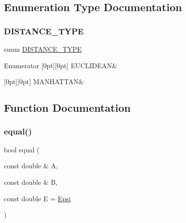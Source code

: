 \subsection{Enumeration Type Documentation}
\mbox{\label{maths_8hh_ac50d7263b1cae8691420b86282b27f90}} 
\subsubsection{\texorpdfstring{DISTANCE\_TYPE}{DISTANCE\_TYPE}}
{\footnotesize\ttfamily enum \mbox{\hyperlink{maths_8hh_ac50d7263b1cae8691420b86282b27f90}{D\+I\+S\+T\+A\+N\+C\+E\+\_\+\+T\+Y\+PE}}}

\begin{DoxyEnumFields}{Enumerator}
[0pt][0pt]{}\mbox{\label{maths_8hh_ac50d7263b1cae8691420b86282b27f90a81bbbc4428c3ff3f1327e94957e2b5f1}} 
E\+U\+C\+L\+I\+D\+E\+AN&\\
\hline

[0pt][0pt]{}\mbox{\label{maths_8hh_ac50d7263b1cae8691420b86282b27f90a9ae95b5995796e7e5f32fa482a5bff98}} 
M\+A\+N\+H\+A\+T\+T\+AN&\\
\hline

\end{DoxyEnumFields}


\subsection{Function Documentation}
\mbox{\label{maths_8hh_a24e66125d5c9aea6608f537bdf77841e}} 
\subsubsection{\texorpdfstring{equal()}{equal()}}
{\footnotesize\ttfamily bool equal (\begin{DoxyParamCaption}\item[{const double \&}]{A,  }\item[{const double \&}]{B,  }\item[{const double}]{E = {\ttfamily \mbox{\hyperlink{maths_8hh_a78802b279ab85021d7f6bffe51621703}{Epsi}}} }\end{DoxyParamCaption})\hspace{0.3cm}{\ttfamily [inline]}}



